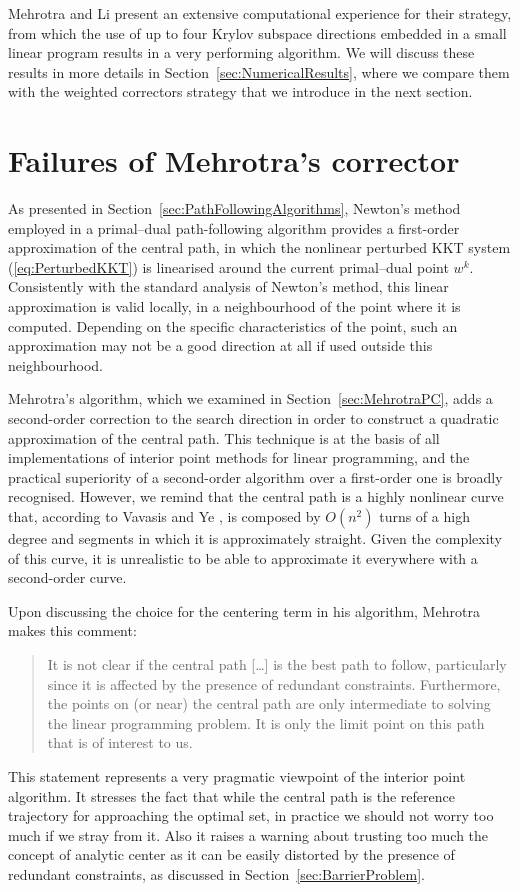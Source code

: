 Mehrotra and Li \cite{MehrotraLi} present an extensive 
computational experience for their strategy, from which 
the use of up to four Krylov subspace directions embedded in a small
linear program results in a very performing algorithm.
We will discuss these results in more details in 
Section~\ref{sec:NumericalResults}, where we compare them with
the weighted correctors strategy that we introduce in the
next section.


%
%
\section{Failures of Mehrotra's corrector}

As presented in Section~\ref{sec:PathFollowingAlgorithms},
Newton's method employed in a primal--dual path-following algorithm
provides a first-order approximation of the central path, in which
the nonlinear perturbed KKT system (\ref{eq:PerturbedKKT}) 
is linearised around the current primal--dual point $w^k$. Consistently with 
the standard analysis of Newton's method, this linear approximation 
is valid locally, in a neighbourhood of the point where 
it is computed. Depending on the specific characteristics of the point, 
such an approximation may not be a good direction at all 
if used outside this neighbourhood.

Mehrotra's algorithm, which we examined in 
Section~\ref{sec:MehrotraPC}, adds a second-order correction to the search 
direction in order to construct a quadratic approximation 
of the central path. This technique is at the basis of all
implementations of interior point methods for linear programming,
and the practical superiority of a second-order algorithm over 
a first-order one is broadly recognised.
However, we remind that 
the central path is a highly nonlinear curve that, according 
to Vavasis and Ye \cite{VavasisYe}, is composed by $O(n^2)$ turns 
of a high degree and segments in which it is approximately straight. 
Given the complexity of this curve, it is unrealistic to be able 
to approximate it everywhere with a second-order curve.

Upon discussing the choice for the centering term in his algorithm,
Mehrotra \cite{Mehrotra92} makes this comment:
\begin{quotation}
It is not clear if the central path [\ldots]
is the best path to follow, particularly since it
is affected by the presence of redundant constraints. Furthermore,
the points on (or near) the central path are only intermediate to
solving the linear programming problem. It is only the limit point 
on this path that is of interest to us.
\end{quotation}
This statement represents a very pragmatic viewpoint of the interior
point algorithm. It stresses the fact that while the central path
is the reference trajectory for approaching the optimal set,
in practice we should not worry too much if we stray from it.
Also it raises a warning about trusting too much the concept
of analytic center as it can be easily distorted by the presence
of redundant constraints, as discussed in Section~\ref{sec:BarrierProblem}.

